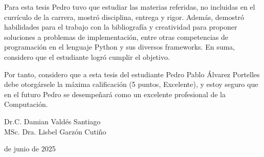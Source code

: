 \begin{opinion}
    Para esta tesis Pedro tuvo que estudiar las materias referidas, no incluidas en el currículo de la carrera, mostró disciplina, entrega y rigor. Además, demostró habilidades para el trabajo con la bibliografía y creatividad para proponer soluciones a problemas de implementación, entre otras competencias de programación en el lenguaje Python y sus diversos frameworks. En suma, considero que el estudiante logró cumplir el objetivo.

    \vspace{0.5cm}

    Por tanto, considero que a esta tesis del estudiante Pedro Pablo Álvarez Portelles debe otorgársele la máxima calificación (5 puntos, Excelente), y estoy seguro que en el futuro Pedro se desempeñará como un excelente profesional de la Computación.

    \vspace{1cm}

    \noindent
    Dr.C. Damian Valdés Santiago \\
    MSc. Dra. Lisbel Garzón Cutiño

    \vspace{0.5cm}

     de junio de 2025
\end{opinion}